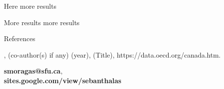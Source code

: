 \documentclass[t,9pt,aspectratio=169]{beamer}
\begin{document}
\begin{frame}{Here more results}

\begin{block}{More results}
 more results
\end{block}
\end{frame}

\begin{frame}
{References}
\begin{footnotesize}
\begin{thebibliography}{1}
,
(co-author(s) if any) (year), (Title), https://data.oecd.org/canada.htm. 
\end{thebibliography}
\end{footnotesize}
\vspace{0.5cm}

\begin{center}
\footnotesize {\textbf{smoragas@sfu.ca}}, \\
\footnotesize {\textbf{sites.google.com/view/sebanthalas}}
\end{center}

\end{frame}
\end{document}
